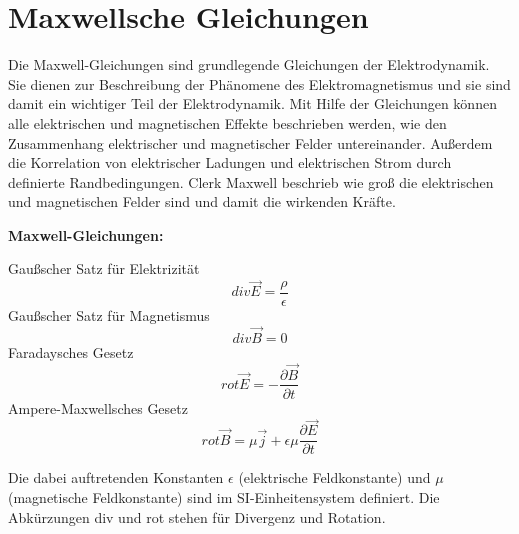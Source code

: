 \section{Maxwellsche Gleichungen}

Die Maxwell-Gleichungen sind grundlegende Gleichungen der Elektrodynamik. Sie dienen zur Beschreibung der Phänomene des Elektromagnetismus und sie sind damit ein wichtiger Teil der Elektrodynamik. Mit Hilfe der Gleichungen können alle elektrischen und magnetischen Effekte beschrieben werden, wie den Zusammenhang elektrischer und magnetischer Felder untereinander. Außerdem die Korrelation von elektrischer Ladungen und elektrischen Strom durch definierte Randbedingungen. Clerk Maxwell beschrieb wie groß die elektrischen und magnetischen Felder sind und damit die wirkenden Kräfte.


\textbf{Maxwell-Gleichungen:}

Gaußscher Satz für Elektrizität		\[div \vec{E} = \frac{\rho}{\epsilon}\]		
Gaußscher Satz für Magnetismus 		\[div \vec{B} = 0\]
Faradaysches Gesetz					\[rot \vec{E} = -\frac{\partial\vec{B}}{\partial t}\]
Ampere-Maxwellsches Gesetz			\[rot \vec{B} = \mu\vec{j}+\epsilon\mu\frac{\partial\vec{E}}{\partial t}\]
\cite{halliday2017halliday}

Die dabei auftretenden Konstanten $\epsilon$ (elektrische Feldkonstante) und $\mu$ (magnetische Feldkonstante) sind im SI-Einheitensystem definiert. Die Abkürzungen div und rot stehen für Divergenz und Rotation. 

